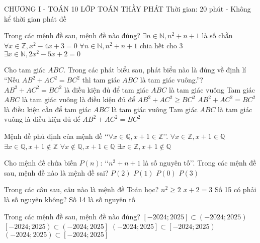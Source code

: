 \begin{name}
	{\tenchude}
	{CHƯƠNG I - TOÁN 10}
	{LỚP TOÁN THẦY PHÁT}
	{Thời gian: 20 phút - Không kể thời gian phát đề}
\end{name}

\TN
\begin{ex}
Trong các mệnh đề sau, mệnh đề nào đúng?
\choice
{$\exists n\in \mathbb{N},n^2+n+1$ là số chẵn}
{$\forall x\in \mathbb{Z},x^2-4x+3=0$}
{$\forall n\in \mathbb{N},n^2+n+1$ chia hết cho 3}
{$\exists x\in \mathbb{N},2x^2-5x+2=0$}
\end{ex}
\begin{ex}
Cho tam giác $ABC$. Trong các phát biểu sau, phát biểu nào là đúng về định lí “Nếu $AB^2+AC^2=BC^2$ thì tam giác $ABC$ là tam giác vuông.”?
\choice
{$AB^2+AC^2=BC^2$ là điều kiện đủ để tam giác $ABC$ là tam giác vuông}
{Tam giác $ABC$ là tam giác vuông là điều kiện đủ để $AB^2+AC^2\ge BC^2$}
{$AB^2+AC^2=BC^2$ là điều kiện cần để tam giác $ABC$ là tam giác vuông}
{Tam giác $ABC$ là tam giác vuông là điều kiện đủ để $AB^2+AC^2=BC^2$}
\end{ex}
\begin{ex}
Mệnh đề phủ định của mệnh đề \lq\lq  $\forall x\in \mathbb{Q},x+1\in \mathbb{Z}$\rq\rq.
\choice
{$\forall x\in \mathbb{Z},x+1\in \mathbb{Q}$}
{$\exists x\in \mathbb{Q},x+1\notin \mathbb{Z}$}
{$\forall x\notin \mathbb{Q},x+1\in \mathbb{Q}$}
{$\exists x\in \mathbb{Z},x+1\notin \mathbb{Q}$}
\end{ex}
\begin{ex}
Cho mệnh đề chứa biến $P(n)$: \lq\lq $n^2+n+1$ là số nguyên tố\rq\rq. Trong các mệnh đề sau, mệnh đề nào là mệnh đề sai?
\choice
{$P(2)$}
{$P(1)$}
{$P(0)$}
{$P(3)$}
\end{ex}
\begin{ex}
Trong các câu sau, câu nào là mệnh đề Toán học?
\choice
{$n^2\ge 2$}
{$x+2=3$}
{Số 15 có phải là số nguyên không?}
{Số 14 là số nguyên tố}
\end{ex}
\begin{ex}
Trong các mệnh đề sau, mệnh đề nào đúng?
\choice
{$\left[-2024;2025\right]\subset \left(-2024;2025\right)$}
{$\left[-2024;2025\right)\subset \left(-2024;2025\right]$}
{$\left(-2024;2025\right]\subset \left[-2024;2025\right)$}
{$\left(-2024;2025\right)\subset \left[-2024;2025\right]$}
\end{ex}

